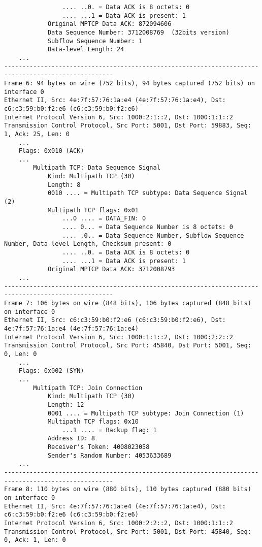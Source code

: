 \begin{verbatim}
                .... ..0. = Data ACK is 8 octets: 0
                .... ...1 = Data ACK is present: 1
            Original MPTCP Data ACK: 872094606
            Data Sequence Number: 3712008769  (32bits version)
            Subflow Sequence Number: 1
            Data-level Length: 24
    ...
----------------------------------------------------------------------------------------------------
Frame 6: 94 bytes on wire (752 bits), 94 bytes captured (752 bits) on interface 0
Ethernet II, Src: 4e:7f:57:76:1a:e4 (4e:7f:57:76:1a:e4), Dst: c6:c3:59:b0:f2:e6 (c6:c3:59:b0:f2:e6)
Internet Protocol Version 6, Src: 1000:2:1::2, Dst: 1000:1:1::2
Transmission Control Protocol, Src Port: 5001, Dst Port: 59883, Seq: 1, Ack: 25, Len: 0
    ...
    Flags: 0x010 (ACK)
    ...
        Multipath TCP: Data Sequence Signal
            Kind: Multipath TCP (30)
            Length: 8
            0010 .... = Multipath TCP subtype: Data Sequence Signal (2)
            Multipath TCP flags: 0x01
                ...0 .... = DATA_FIN: 0
                .... 0... = Data Sequence Number is 8 octets: 0
                .... .0.. = Data Sequence Number, Subflow Sequence Number, Data-level Length, Checksum present: 0
                .... ..0. = Data ACK is 8 octets: 0
                .... ...1 = Data ACK is present: 1
            Original MPTCP Data ACK: 3712008793
    ...
----------------------------------------------------------------------------------------------------
Frame 7: 106 bytes on wire (848 bits), 106 bytes captured (848 bits) on interface 0
Ethernet II, Src: c6:c3:59:b0:f2:e6 (c6:c3:59:b0:f2:e6), Dst: 4e:7f:57:76:1a:e4 (4e:7f:57:76:1a:e4)
Internet Protocol Version 6, Src: 1000:1:1::2, Dst: 1000:2:2::2
Transmission Control Protocol, Src Port: 45840, Dst Port: 5001, Seq: 0, Len: 0
    ...
    Flags: 0x002 (SYN)
    ...
        Multipath TCP: Join Connection
            Kind: Multipath TCP (30)
            Length: 12
            0001 .... = Multipath TCP subtype: Join Connection (1)
            Multipath TCP flags: 0x10
                ...1 .... = Backup flag: 1
            Address ID: 8
            Receiver's Token: 4008023058
            Sender's Random Number: 4053633689
    ...
----------------------------------------------------------------------------------------------------
Frame 8: 110 bytes on wire (880 bits), 110 bytes captured (880 bits) on interface 0
Ethernet II, Src: 4e:7f:57:76:1a:e4 (4e:7f:57:76:1a:e4), Dst: c6:c3:59:b0:f2:e6 (c6:c3:59:b0:f2:e6)
Internet Protocol Version 6, Src: 1000:2:2::2, Dst: 1000:1:1::2
Transmission Control Protocol, Src Port: 5001, Dst Port: 45840, Seq: 0, Ack: 1, Len: 0

\end{verbatim}
